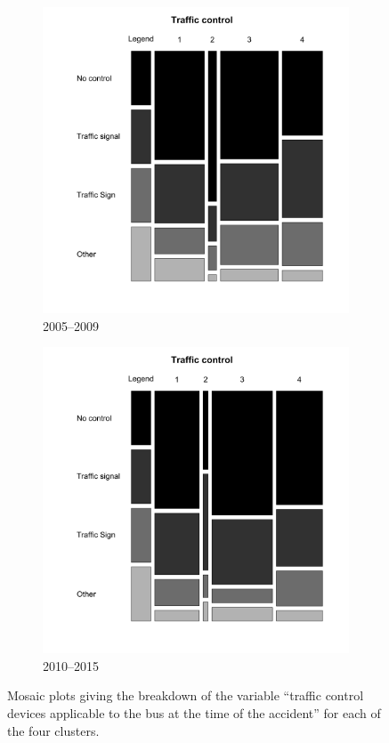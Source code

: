\begin{figure}[t]
        \begin{subfigure}{.5\textwidth}
                \includegraphics[width=1\linewidth]{traf_control_0509.png}
                \caption{2005--2009}
        \end{subfigure}%
        \begin{subfigure}{.5\textwidth}
                \includegraphics[width=1\linewidth]{traf_control.png}
                \caption{2010--2015}
        \end{subfigure}
        \caption{Mosaic plots giving the breakdown of the variable ``traffic control devices applicable to the bus at the time of the accident'' for each of the four clusters.}
        \label{fig:clus8}
\end{figure}
